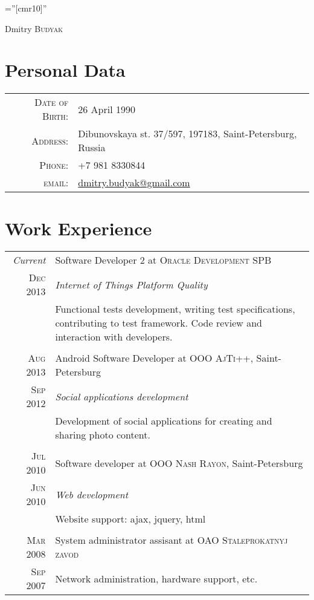 \documentclass[a4paper,10pt]{article}
\begin{document}
\pagestyle{empty}

\font\fb=''[cmr10]''

\par{\centering
	{\Huge Dmitry \textsc{Budyak}
	}\bigskip\par}

\section{Personal Data}

\begin{tabular}{rl}
\textsc{Date of Birth:} &  26 April 1990 \\
		\textsc{Address:}   & Dibunovskaya st. 37/597, 197183, Saint-Petersburg, Russia \\
		\textsc{Phone:}     & +7 981 8330844 \\
		\textsc{email:}     & \href{mailto:dmitry.budyak@gmail.com}{dmitry.budyak@gmail.com}
		\end{tabular}

		\section{Work Experience}
		\begin{tabular}{r|p{11cm}}
		\emph{Current} & Software Developer 2 at \textsc{Oracle Development SPB} \\\textsc{Dec 2013}&\emph{Internet of Things Platform Quality}\\&\footnotesize{Functional tests development, writing test specifications, contributing to test framework. Code review and interaction with developers.}\\\multicolumn{2}{c}{} \\

		\textsc{Aug 2013} & Android Software Developer at \textsc{OOO AjTi++}, Saint-Petersburg \\\textsc{Sep 2012}&\emph{Social applications development}\\&\footnotesize{Development of social applications for creating and sharing photo content.}\\\multicolumn{2}{c}{} \\

		\textsc{Jul 2010} & Software developer at \textsc{OOO Nash Rayon}, Saint-Petersburg \\\textsc{Jun 2010}&\emph{Web development}\\&\footnotesize{Website support: ajax, jquery, html}\\\multicolumn{2}{c}{} \\

		\textsc{Mar 2008} & System administrator assisant at \textsc{OAO Staleprokatnyj zavod}\\\textsc{Sep 2007}&\footnotesize{Network administration, hardware support, etc.}


		\end{tabular}
\end{document}
